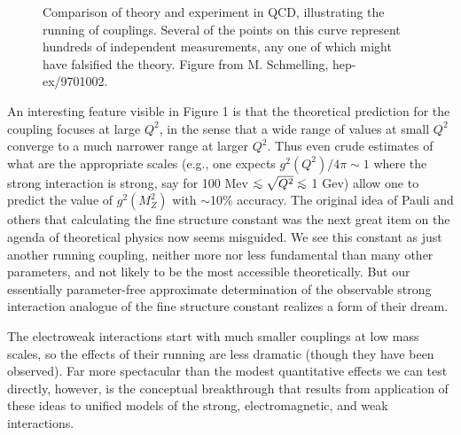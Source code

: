 \documentclass[aps,epsf]{revtex4}
\def\lsim{\mathrel{\raise.3ex\hbox{$<$}\mkern-14mu
             \lower0.6ex\hbox{$\sim$}}}
\begin{document}
\begin{figure}
\centerline{}
\caption{Comparison of theory and experiment in QCD,
illustrating the running of couplings.  Several of the points on this
curve represent hundreds of independent measurements, any one of which
might have falsified the theory. Figure from M. Schmelling, hep-ex/9701002. }
\label{fig1}
\end{figure}





An interesting feature visible in
Figure 1 is that the theoretical prediction for the coupling focuses
at large $Q^2$, in the sense that a wide range of values at small
$Q^2$ converge to a much narrower range at larger $Q^2$.  Thus even
crude estimates of what are the appropriate scales (e.g., one expects
$g^2(Q^2)/4 \pi \sim 1$ where the strong interaction is strong, say
for 100 Mev $\lsim \sqrt{Q^2} \lsim$ 1 Gev) allow one to predict the value of
$g^2(M_Z^2)$ with $\sim$10\% accuracy.  The original idea of Pauli and
others that calculating the fine structure constant was the next great
item on the agenda of theoretical physics now seems misguided.  We see
this constant as just another running coupling, neither more nor less
fundamental than many other parameters, and not likely to be the most
accessible theoretically.  But our essentially parameter-free approximate
determination of the observable strong interaction analogue of the
fine structure constant realizes a form of their dream. 

The
electroweak interactions start with much smaller couplings at low mass
scales, so the effects of their running are less dramatic (though they
have been observed).  Far more spectacular than the modest quantitative
effects we can test directly, however, is the conceptual breakthrough
that results from 
application of these ideas to unified models of the strong,
electromagnetic, and weak interactions.  
\end{document}
